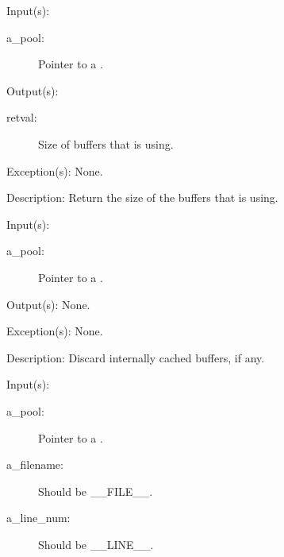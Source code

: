 \begin{capi}
	\begin{capilist}
	\item[Input(s): ]
		\begin{description}\item[]
		\item[a\_pool: ]
			Pointer to a .
		\end{description}
	\item[Output(s): ]
		\begin{description}\item[]
		\item[retval: ]
			Size of buffers that  is using.
		\end{description}
	\item[Exception(s): ] None.
	\item[Description: ]
		Return the size of the buffers that  is using.
	\end{capilist}
\label{pool_drain}
	\begin{capilist}
	\item[Input(s): ]
		\begin{description}\item[]
		\item[a\_pool: ]
			Pointer to a \classname{pool}.
		\end{description}
	\item[Output(s): ] None.
	\item[Exception(s): ] None.
	\item[Description: ]
		Discard internally cached buffers, if any.
	\end{capilist}
\label{pool_get_e}
\label{pool_get}
	\begin{capilist}
	\item[Input(s): ]
		\begin{description}\item[]
		\item[a\_pool: ]
			Pointer to a .
		\item[a\_filename: ]
			Should be \_\_FILE\_\_.
		\item[a\_line\_num: ]
			Should be \_\_LINE\_\_.

\end{description}
\end{capilist}
\end{capi}

